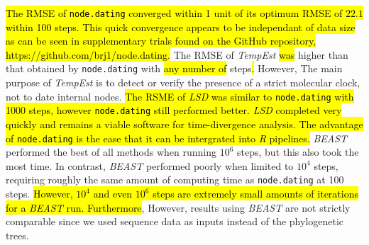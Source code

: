 \documentclass{bioinfo}
\newcommand{\code}[1]{{\tt #1}}
\newcommand{\edit}[1]{\hl{#1}}
\begin{document}
\edit{The RMSE of {\tt node.dating} converged within 1 unit of its optimum RMSE of $22.1$ within 100 steps.
This quick convergence appears to be independant of data size as can be seen in supplementary trials found on the GitHub repository, https://github.com/brj1/node.dating.}
The\edit{ }RMSE\edit{} of \emph{TempEst} \edit{was} higher than that obtained by \code{node.dating} with \edit{any number of} steps\edit{.}
However, The main purpose of \emph{TempEst} is to detect or verify the presence of a strict molecular clock, not to date internal nodes.
\edit{The RSME of \emph{LSD} was similar to {\tt node.dating} with 1000 steps, however {\tt node.dating} still performed better.
\emph{LSD} completed very quickly and remains a viable software for time-divergence analysis.
The advantage of {\tt node.dating} is the ease that it can be intergrated into \emph{R} pipelines.}
\emph{BEAST} performed the best of all methods when running $10^6$ steps, but this also took the most time.
In contrast, \emph{BEAST} performed poorly when limited to $10^4$ steps, requiring roughly the same amount of computing time as \code{node.dating} at 100 steps.
\edit{However, $10^4$ and even $10^6$ steps are extremely small amounts of iterations for a \emph{BEAST} run. Furthermore},
However, results using \emph{BEAST} are not strictly comparable since we used sequence data as inputs instead of the phylogenetic trees.
\end{document}
